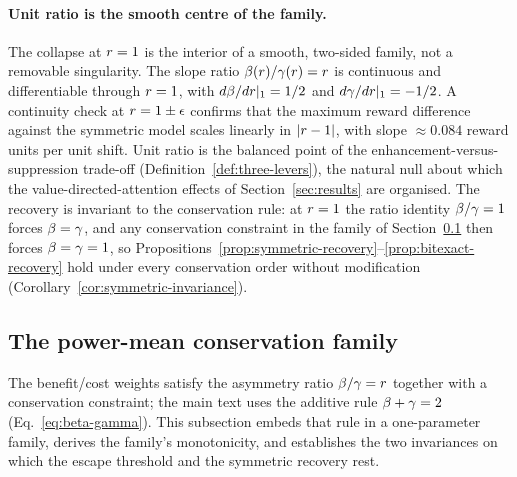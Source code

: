 \paragraph{Unit ratio is the smooth centre of the family.}
The collapse at $r = 1$ is the interior of a smooth, two-sided
family, not a removable singularity. The slope ratio
$\beta(r)/\gamma(r) = r$ is continuous and
differentiable through $r = 1$, with
$d\beta/dr|_{1} = 1/2$ and $d\gamma/dr|_{1} = -1/2$. A
continuity check at $r = 1 \pm \epsilon$ confirms that the maximum
reward difference against the symmetric model scales linearly in
$|r - 1|$, with slope $\approx 0.084$ reward units per unit shift.
Unit ratio is the balanced point of the enhancement-versus-suppression
trade-off (Definition~\ref{def:three-levers}), the natural null about
which the value-directed-attention effects of
Section~\ref{sec:results} are organised. The recovery is invariant to the
conservation rule: at $r = 1$ the ratio identity
$\beta/\gamma = 1$ forces $\beta = \gamma$, and any conservation
constraint in the family of Section~\ref{sec:supp-conservation} then
forces $\beta = \gamma = 1$, so
Propositions~\ref{prop:symmetric-recovery}--\ref{prop:bitexact-recovery}
hold under every conservation order without modification
(Corollary~\ref{cor:symmetric-invariance}).

\subsection{The power-mean conservation family}
\label{sec:supp-conservation}

The benefit/cost weights satisfy the asymmetry ratio
$\beta/\gamma = r$ together with a conservation constraint; the
main text uses the additive rule $\beta + \gamma = 2$
(Eq.~\ref{eq:beta-gamma}). This subsection embeds that rule in a
one-parameter family, derives the family's monotonicity, and establishes
the two invariances on which the escape threshold and the symmetric
recovery rest.

